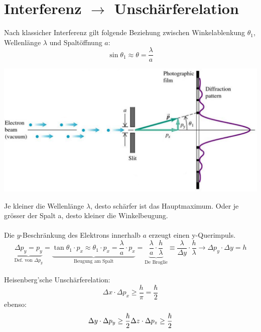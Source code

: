   \section{Interferenz $\rightarrow$ Unschärferelation}
  Nach klassicher Interferenz gilt folgende Beziehung zwischen Winkelablenkung $\theta_1$, Wellenlänge $\lambda$ und Spaltöffnung $a$:\
  \[
  		\sin\theta_1\approx \theta = \frac{\lambda}{a}
  \]
   \begin{center}
   	\includegraphics[scale = 0.2]{images/unschaerferelation.jpg}
   \end{center}
  Je kleiner die Wellenlänge $\lambda$, desto schärfer ist das Hauptmaximum. Oder je grösser der Spalt a, desto kleiner die Winkelbeugung.\\
  \\
  Die $y$-Beschränkung des Elektrons innerhalb $a$ erzeugt einen y-Querimpuls.
  \[
  		\underbrace{\Delta p_y=p_y}_{\text{Def. von $\Delta p_y$}}=
  		\underbrace{\tan\theta_1\cdot p_x \approx \theta_1\cdot p_x= \frac{\lambda}{a}\cdot p_x}_{\text{Beugung am Spalt}}=
  		\underbrace{\frac{\lambda}{a}\cdot\frac{h}{\lambda}}_{\text{De Broglie}}\equiv
  		\frac{\lambda}{\Delta y}\cdot\frac{h}{\lambda}
  		\rightarrow \Delta p_y\cdot\Delta y = h
  \]
\\
Heisenberg'sche Unschärferelation:
\[
	\Delta x \cdot \Delta p_x \geq \frac{h}{\pi}= \frac{\hbar}{2}	
\]
ebenso:
\[
	\Delta y \cdot \Delta p_y \geq \frac{\hbar}{2}	\\ \Delta z \cdot \Delta p_z \geq \frac{\hbar}{2} \\ \\
\]